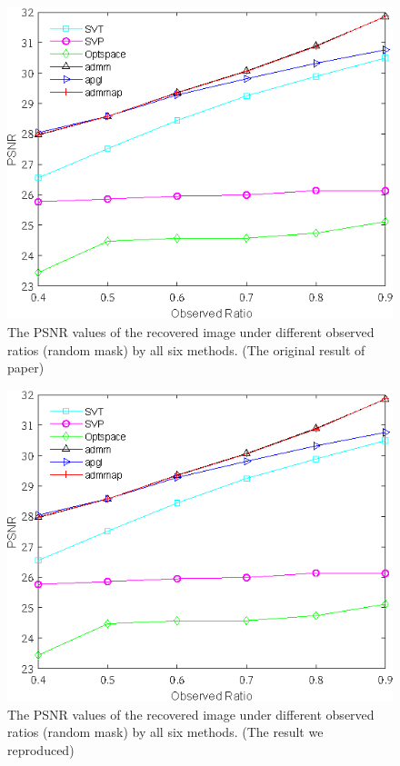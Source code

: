 \documentclass{article}
\begin{document}
{\begin{figure}[ht]
	\centering
	\includegraphics[]{./assets/fig5.eps}
	\caption{The PSNR values of the recovered image under different
		observed ratios (random mask) by all six methods. (The original result of paper)}
	\label{fig5ori}
\end{figure}
\begin{figure}[ht]
	\centering
	\includegraphics[]{./assets/fig5.eps}
	\caption{The PSNR values of the recovered image under different
		observed ratios (random mask) by all six methods. (The result we reproduced)}
	\label{fig5}
\end{figure}

}
\end{document}

